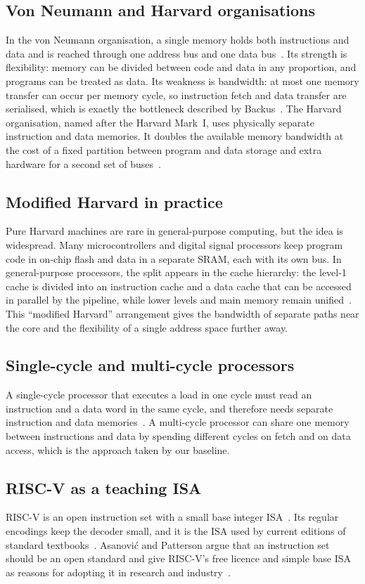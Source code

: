 \documentclass[conference]{IEEEtran}
\begin{document}
\subsection{Von Neumann and Harvard organisations}
In the von Neumann organisation, a single memory holds both instructions and
data and is reached through one address bus and one data
bus~\cite{vonneumann_edvac}. Its strength is flexibility: memory can be
divided between code and data in any proportion, and programs can be treated
as data. Its weakness is bandwidth: at most one memory transfer can occur per
memory cycle, so instruction fetch and data transfer are serialised, which is
exactly the bottleneck described by Backus~\cite{backus1978}. The
Harvard organisation, named after the Harvard Mark~I, uses physically
separate instruction and data memories. It doubles the available memory
bandwidth at the cost of a fixed partition between program and data storage
and extra hardware for a second set of buses~\cite{hennessy_quant}.

\subsection{Modified Harvard in practice}
Pure Harvard machines are rare in general-purpose computing, but the idea is
widespread. Many microcontrollers and digital signal processors keep program
code in on-chip flash and data in a separate SRAM, each with its own bus. In
general-purpose processors, the split appears in the cache hierarchy: the
level-1 cache is divided into an instruction cache and a data cache that can
be accessed in parallel by the pipeline, while lower levels and main memory
remain unified~\cite{patterson_riscv,hennessy_quant}. This ``modified
Harvard'' arrangement gives the bandwidth of separate paths near the core and
the flexibility of a single address space further away.

\subsection{Single-cycle and multi-cycle processors}
A single-cycle processor that executes a load in one cycle must read an
instruction and a data word in the same cycle, and therefore needs separate
instruction and data memories~\cite{patterson_riscv,harris_riscv}. A
multi-cycle processor can share one memory between instructions and data by
spending different cycles on fetch and on data access, which is the approach
taken by our baseline.

\subsection{RISC-V as a teaching ISA}
RISC-V is an open instruction set with a small base integer
ISA~\cite{riscv_isa}. Its regular encodings keep the decoder small, and it is
the ISA used by current editions of standard
textbooks~\cite{patterson_riscv,harris_riscv}. Asanovi\'{c} and Patterson
argue that an instruction set should be an open standard and give RISC-V's
free licence and simple base ISA as reasons for adopting it in research and
industry~\cite{asanovic2014free}.
\end{document}
